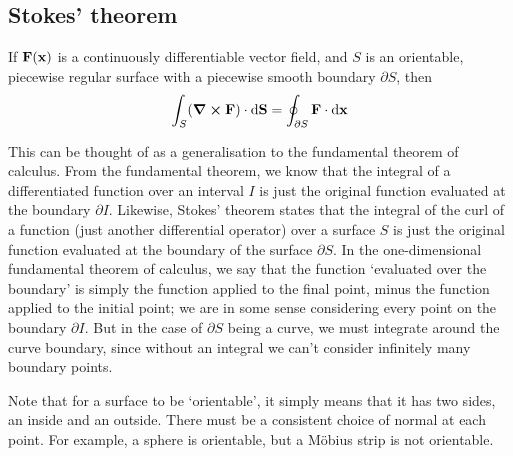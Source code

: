 \subsection{Stokes' theorem}
\begin{proposition}
	If \(\vb F(\vb x)\) is a continuously differentiable vector field, and \(S\) is an orientable, piecewise regular surface with a piecewise smooth boundary \(\partial S\), then
	\[
		\int_S (\curl{\vb F}) \cdot \dd \vb S = \oint_{\partial S} \vb F\cdot \dd{\vb x}
	\]
\end{proposition}
\noindent This can be thought of as a generalisation to the fundamental theorem of calculus.
From the fundamental theorem, we know that the integral of a differentiated function over an interval \(I\) is just the original function evaluated at the boundary \(\partial I\).
Likewise, Stokes' theorem states that the integral of the curl of a function (just another differential operator) over a surface \(S\) is just the original function evaluated at the boundary of the surface \(\partial S\).
In the one-dimensional fundamental theorem of calculus, we say that the function `evaluated over the boundary' is simply the function applied to the final point, minus the function applied to the initial point; we are in some sense considering every point on the boundary \(\partial I\).
But in the case of \(\partial S\) being a curve, we must integrate around the curve boundary, since without an integral we can't consider infinitely many boundary points.

Note that for a surface to be `orientable', it simply means that it has two sides, an inside and an outside.
There must be a consistent choice of normal at each point.
For example, a sphere is orientable, but a M\"obius strip is not orientable.

